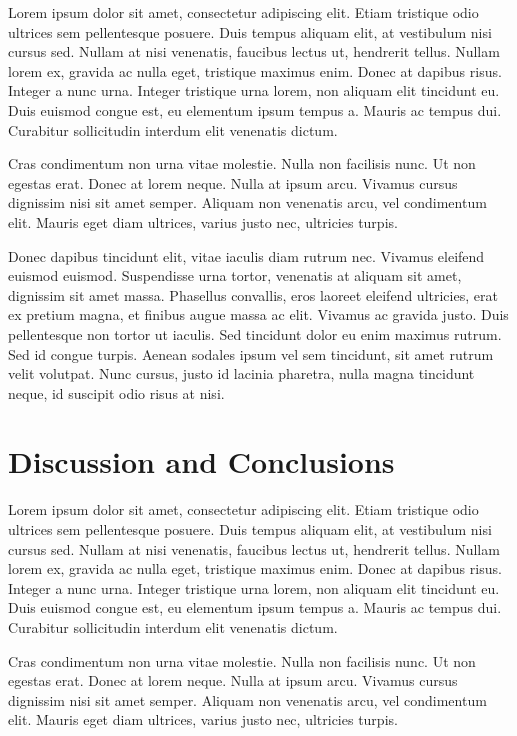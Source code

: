 \documentclass[11pt, a4paper]{JTH}
\begin{document}
Lorem ipsum dolor sit amet, consectetur adipiscing elit. Etiam tristique odio ultrices sem pellentesque posuere. Duis tempus aliquam elit, at vestibulum nisi cursus sed. Nullam at nisi venenatis, faucibus lectus ut, hendrerit tellus. Nullam lorem ex, gravida ac nulla eget, tristique maximus enim. Donec at dapibus risus. Integer a nunc urna. Integer tristique urna lorem, non aliquam elit tincidunt eu. Duis euismod congue est, eu elementum ipsum tempus a. Mauris ac tempus dui. Curabitur sollicitudin interdum elit venenatis dictum.

Cras condimentum non urna vitae molestie. Nulla non facilisis nunc. Ut non egestas erat. Donec at lorem neque. Nulla at ipsum arcu. Vivamus cursus dignissim nisi sit amet semper. Aliquam non venenatis arcu, vel condimentum elit. Mauris eget diam ultrices, varius justo nec, ultricies turpis.

Donec dapibus tincidunt elit, vitae iaculis diam rutrum nec. Vivamus eleifend euismod euismod. Suspendisse urna tortor, venenatis at aliquam sit amet, dignissim sit amet massa. Phasellus convallis, eros laoreet eleifend ultricies, erat ex pretium magna, et finibus augue massa ac elit. Vivamus ac gravida justo. Duis pellentesque non tortor ut iaculis. Sed tincidunt dolor eu enim maximus rutrum. Sed id congue turpis. Aenean sodales ipsum vel sem tincidunt, sit amet rutrum velit volutpat. Nunc cursus, justo id lacinia pharetra, nulla magna tincidunt neque, id suscipit odio risus at nisi.

\chapter{Discussion and Conclusions}
\label{chap:DiscussionConclusions}

Lorem ipsum dolor sit amet, consectetur adipiscing elit. Etiam tristique odio ultrices sem pellentesque posuere. Duis tempus aliquam elit, at vestibulum nisi cursus sed. Nullam at nisi venenatis, faucibus lectus ut, hendrerit tellus. Nullam lorem ex, gravida ac nulla eget, tristique maximus enim. Donec at dapibus risus. Integer a nunc urna. Integer tristique urna lorem, non aliquam elit tincidunt eu. Duis euismod congue est, eu elementum ipsum tempus a. Mauris ac tempus dui. Curabitur sollicitudin interdum elit venenatis dictum.

Cras condimentum non urna vitae molestie. Nulla non facilisis nunc. Ut non egestas erat. Donec at lorem neque. Nulla at ipsum arcu. Vivamus cursus dignissim nisi sit amet semper. Aliquam non venenatis arcu, vel condimentum elit. Mauris eget diam ultrices, varius justo nec, ultricies turpis.
\end{document}
